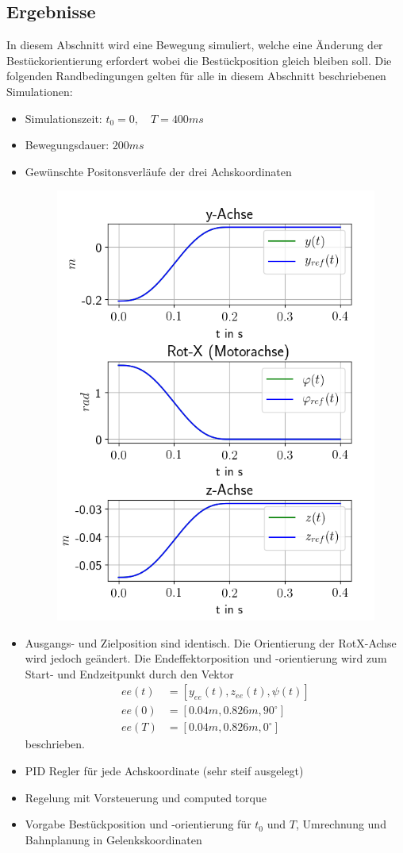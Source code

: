 \documentclass[10pt,a4paper]{iace.report}
\begin{document}
		\subsection{Ergebnisse}
			In diesem Abschnitt wird eine Bewegung simuliert, welche eine Änderung der Bestückorientierung erfordert wobei die Bestückposition gleich bleiben soll. Die folgenden Randbedingungen gelten für alle in diesem Abschnitt beschriebenen Simulationen:
			\begin{itemize}
				\item Simulationszeit: $ t_{0} = 0, \quad T = 400ms $
				\item Bewegungsdauer: $ 200ms $
				\item Gewünschte Positonsverläufe der drei Achskoordinaten
				\begin{figure}[h!]
					\centering
					\includegraphics[width=0.5\linewidth]{./pics/inputs.png}
				\end{figure}
				\item Ausgangs- und Zielposition sind identisch. Die Orientierung der RotX-Achse wird jedoch geändert. Die Endeffektorposition und -orientierung wird zum Start- und Endzeitpunkt durch den Vektor
				\begin{align*}
				ee(t) &= [y_{ee}(t), z_{ee}(t), \psi(t)]\\
				ee(0) &= [0.04m,0.826m,90^{\circ}]\\
				ee(T) &= [0.04m,0.826m,0^{\circ}]
				\end{align*}	
				beschrieben.
				\item PID Regler für jede Achskoordinate (sehr steif ausgelegt)
				\item Regelung mit Vorsteuerung und computed torque
				\item Vorgabe Bestückposition und -orientierung für $ t_{0} $ und $ T $, Umrechnung und Bahnplanung in Gelenkskoordinaten
			\end{itemize}
\end{document}
